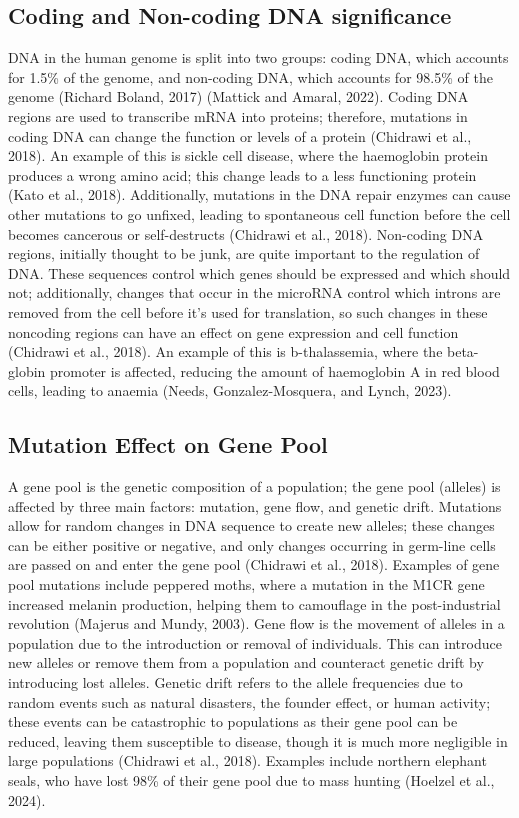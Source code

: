 \documentclass{mva_style}
\begin{document}
\subsection{Coding and Non-coding DNA significance}
DNA in the human genome is split into two groups: coding DNA, which accounts for 1.5\% of the genome, and non-coding DNA, which accounts for 98.5\% of the genome (Richard Boland, 2017) (Mattick and Amaral, 2022).
Coding DNA regions are used to transcribe mRNA into proteins; therefore, mutations in coding DNA can change the function or levels of a protein (Chidrawi et al., 2018). An example of this is sickle cell disease, where the haemoglobin protein produces a wrong amino acid; this change leads to a less functioning protein (Kato et al., 2018). Additionally, mutations in the DNA repair enzymes can cause other mutations to go unfixed, leading to spontaneous cell function before the cell becomes cancerous or self-destructs (Chidrawi et al., 2018).
Non-coding DNA regions, initially thought to be junk, are quite important to the regulation of DNA. These sequences control which genes should be expressed and which should not; additionally, changes that occur in the microRNA control which introns are removed from the cell before it's used for translation, so such changes in these noncoding regions can have an effect on gene expression and cell function (Chidrawi et al., 2018). An example of this is b-thalassemia, where the beta-globin promoter is affected, reducing the amount of haemoglobin A in red blood cells, leading to anaemia (Needs, Gonzalez-Mosquera, and Lynch, 2023).

\subsection{Mutation Effect on Gene Pool}
A gene pool is the genetic composition of a population; the gene pool (alleles) is affected by three main factors: mutation, gene flow, and genetic drift.
Mutations allow for random changes in DNA sequence to create new alleles; these changes can be either positive or negative, and only changes occurring in germ-line cells are passed on and enter the gene pool (Chidrawi et al., 2018). Examples of gene pool mutations include peppered moths, where a mutation in the M1CR gene increased melanin production, helping them to camouflage in the post-industrial revolution (Majerus and Mundy, 2003). 
Gene flow is the movement of alleles in a population due to the introduction or removal of individuals. This can introduce new alleles or remove them from a population and counteract genetic drift by introducing lost alleles.
Genetic drift refers to the allele frequencies due to random events such as natural disasters, the founder effect, or human activity; these events can be catastrophic to populations as their gene pool can be reduced, leaving them susceptible to disease, though it is much more negligible in large populations (Chidrawi et al., 2018). Examples include northern elephant seals, who have lost 98\% of their gene pool due to mass hunting (Hoelzel et al., 2024).
\end{document}
